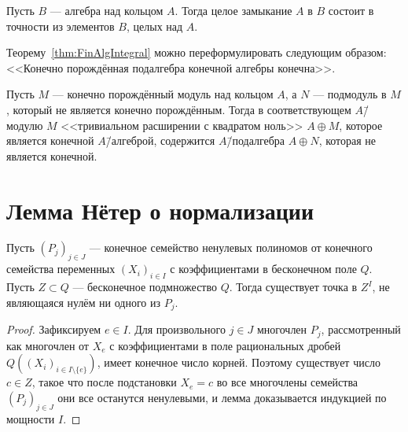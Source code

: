 \documentclass[
	extrafontsizes,
	11pt,
	hyphens,
]{memoir}
\begin{document}
\begin{corollary}
Пусть \(B\) --- алгебра над кольцом \(A\).
Тогда целое замыкание \(A\) в \(B\) состоит в точности из элементов \(B\), целых над \(A\).
\end{corollary}

\begin{remark}
Теорему~\ref{thm:FinAlgIntegral} можно переформулировать следующим образом:
<<Конечно порождённая подалгебра конечной алгебры конечна>>.
\end{remark}

\begin{example}
Пусть \(M\) --- конечно порождённый модуль над кольцом \(A\), а \(N\) --- подмодуль в \(M\), который не является конечно порождённым.
Тогда в соответствующем \(A\)\=/модулю \(M\) <<тривиальном расширении с квадратом ноль>> \(A \oplus M\), которое является конечной \(A\)\=/алгеброй, содержится \(A\)\=/подалгебра \(A \oplus N\), которая не является конечной.
\end{example}


\section{Лемма Нётер о нормализации}



\begin{lemma}
Пусть \((P_j)_{j \in J}\) --- конечное семейство ненулевых полиномов от конечного семейства переменных \((X_i)_{i \in I}\) с коэффициентами в бесконечном поле \(Q\).%
Пусть \(Z \subset Q\) --- бесконечное подмножество \(Q\).
Тогда существует точка в \(Z^I\), не являющаяся нулём ни одного из \(P_j\).
\end{lemma}

\begin{proof}
Зафиксируем \(e \in I\). Для произвольного \(j \in J\) многочлен \(P_j\), рассмотренный как многочлен от \(X_e\) с коэффициентами в поле рациональных дробей \(Q((X_i)_{i \in I \setminus \{e\}})\), имеет конечное число корней. Поэтому существует число \(c \in Z\), такое что после подстановки \(X_e = c\) во все многочлены семейства \((P_j)_{j \in J}\) они все останутся ненулевыми, и лемма доказывается индукцией по мощности \(I\).
\end{proof}
\end{document}

